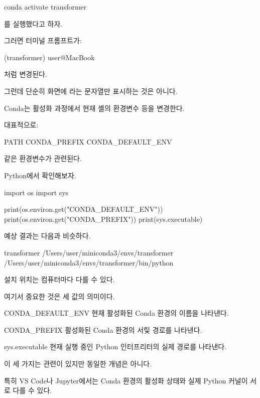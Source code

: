 \begin{dhkzsh}
conda activate transformer
\end{dhkzsh}

를 실행했다고 하자.

그러면 터미널 프롬프트가:

\begin{dhkzsh}
(transformer) user@MacBook ~ %
\end{dhkzsh}

처럼 변경된다.

그런데 단순히 화면에 라는 문자열만 표시하는 것은 아니다.

Conda는 활성화 과정에서 현재 셸의 환경변수 등을 변경한다.

대표적으로:

\begin{dhkzsh}
PATH
CONDA_PREFIX
CONDA_DEFAULT_ENV
\end{dhkzsh}

같은 환경변수가 관련된다.

Python에서 확인해보자.

\begin{dhkcode}
import os
import sys

print(os.environ.get("CONDA_DEFAULT_ENV"))
print(os.environ.get("CONDA_PREFIX"))
print(sys.executable)
\end{dhkcode}

예상 결과는 다음과 비슷하다.

\begin{dhkzsh}
transformer
/Users/user/miniconda3/envs/transformer
/Users/user/miniconda3/envs/transformer/bin/python
\end{dhkzsh}

설치 위치는 컴퓨터마다 다를 수 있다.

여기서 중요한 것은 세 값의 의미이다.

\begin{dhksmry}
    CONDA_DEFAULT_ENV
    \ra 현재 활성화된 Conda 환경의 이름을 나타낸다.


    CONDA_PREFIX
    \ra 활성화된 Conda 환경의 서맃 경로를 나타낸다.


    sys.executable
    \ra 현재 실행 중인 Python 인터프리터의 실제 경로를 나타낸다.
\end{dhksmry}

이 세 가지는 관련이 있지만 동일한 개념은 아니다.

특히 VS Code나 Jupyter에서는 Conda 환경의 활성화 상태와 실제 Python 커널이 서로 다를 수 있다.

